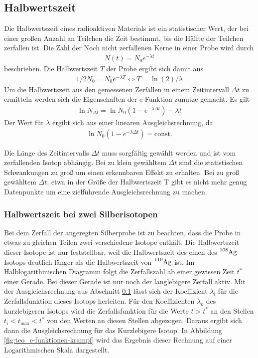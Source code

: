\subsection{Halbwertszeit}
\label{sec:teo_halbwertszeit}
Die Halbwertszeit eines radioaktiven Materials ist ein statistischer Wert,
der bei einer großen Anzahl an Teilchen die Zeit bestimmt, bis die Hälfte der Teilchen zerfallen ist.
Die Zahl der Noch nicht zerfallenen Kerne in einer Probe wird durch 
\begin{align}
    N(t)= N_0 e^{-\lambda t}
\end{align}
beschrieben.
Die Halbwertszeit $T$ der Probe ergibt sich damit aus
\begin{align}
    1/2 N_0 = N_0 e^{-\lambda T} \Leftrightarrow T = \ln(2)/\lambda
    \label{eq:T_aus_lambda}
\end{align}
Um die Halbwertszeit aus den gemessenen Zerfällen in einem Zeitintervall $\Delta t$
zu ermitteln werden sich die Eigenschaften der e-Funktion zunutze gemacht.
Es gilt
\begin{align}
    \ln N_{\Delta t} = \ln{N_0 (1- e^{-\lambda \Delta t})} - \lambda t
    \label{eq:lambda_aus_N}
\end{align}
Der Wert für $\lambda$ ergibt sich aus einer linearen Ausgleichsrechnung, da
\begin{align*}
    \ln{N_0 (1- e^{-\lambda \Delta t})} = \text{const.}
\end{align*}

\noindent
Die Länge des Zeitintervalls $\Delta t$ muss sorgfältig gewählt werden und ist vom
zerfallenden Isotop abhängig.
Bei zu klein gewähltem $\Delta t$ sind die statistischen Schwankungen zu groß um
einen erkennbaren Effekt zu erhalten. 
Bei zu groß gewähltem $\Delta t$, etwa in der Größe der Halbwertszeit T 
gibt es nicht mehr genug Datenpunkte um eine zielführende Ausgleichsrechnung zu machen.



\subsubsection{Halbwertszeit bei zwei Silberisotopen}
Bei dem Zerfall der angeregten Silberprobe ist zu beachten, dass die Probe in etwas zu 
gleichen Teilen zwei verschiedene Isotope enthält.
Die Halbwertszeit dieser Isotope ist nur feststellbar, weil die Halbwertszeit des einen
des $\ce{^{108}Ag}$ Isotops deutlich länger als die Halbwertszeit von $\ce{^{110}Ag}$ ist.
Im Halblogarithmischen Diagramm folgt die Zerfallszahl ab einer gewissen Zeit $t^{*}$ einer Gerade.
Bei dieser Gerade ist nur noch der langlebigere Zerfall aktiv.
Mit der Ausgleichsrechnung aus Abschnitt \ref{sec:teo_halbwertszeit} 
lässt sich der Koeffizient $\lambda_{l}$ für die Zerfallsfunktion dieses Isotops herleiten.
Für den Koeffizienten $\lambda_{k}$ des kurzlebigeren Isotops
wird die Zerfallsfunktion für die Werte $t > t^*$ an den Stellen $t_i < t_\text{max} < t^*$ von den
Werten an diesen Stellen abgezogen. 
Daraus ergibt sich dann die Ausgleichsrechnung für das Kurzlebigere Isotop.
In Abbildung \ref{fig:teo_e-funktionen-krampf} wird das Ergebnis dieser 
Rechnung auf einer Logarithmischen Skala dargestellt.

